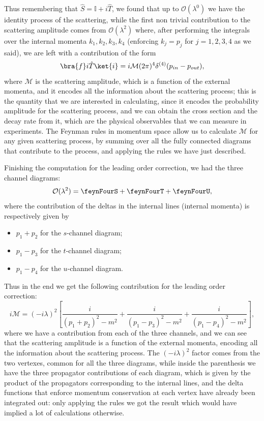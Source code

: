 Thus remembering that \(\hat{S} = \mathbb{I} + i \hat{T}\), we found that up to \(\mathcal{O}(\lambda^0)\) we have the identity process of the scattering, while the first non trivial contribution to the scattering amplitude comes from \(\mathcal{O}(\lambda^2)\) where, after performing the integrals over the internal momenta \(k_1, k_2, k_3, k_4\) (enforcing \(k_j = p_j\) for \(j=1,2,3,4\) as we said), we are left with a contribution of the form
\[
    \bra{f} i\hat{T} \ket{i} = i \mathcal{M} (2\pi)^4 \delta^{(4)} (p_{in} - p_{out} ),
\]
where \(\mathcal{M}\) is the scattering amplitude, which is a function of the external momenta, and it encodes all the information about the scattering process; this is the quantity that we are interested in calculating, since it encodes the probability amplitude for the scattering process, and we can obtain the cross section and the decay rate from it, which are the physical observables that we can measure in experiments. The Feynman rules in momentum space allow us to calculate \(\mathcal{M}\) for any given scattering process, by summing over all the fully connected diagrams that contribute to the process, and applying the rules we have just described.

Finishing the computation for the leading order correction, we had the three channel diagrams:
\[
    \mathcal{O}(\lambda^2) = \feynFourS + \feynFourT + \feynFourU,
\]
where the contribution of the deltas in the internal lines (internal momenta) is respectively given by
\begin{itemize}
    \item \(p_1 + p_2\) for the \(s\)-channel diagram;
    \item \(p_1 - p_3\) for the \(t\)-channel diagram;
    \item \(p_1 - p_4\) for the \(u\)-channel diagram.
\end{itemize}
Thus in the end we get the following contribution for the leading order correction:
\[
    i \mathcal{M} = (-i \lambda)^2 \left[ \frac{i}{(p_1 + p_2)^{2} - m^2} + \frac{i}{(p_1 - p_3)^{2} - m^2} + \frac{i}{(p_1 - p_4)^{2} - m^2} \right],
\]
where we have a contribution from each of the three channels, and we can see that the scattering amplitude is a function of the external momenta, encoding all the information about the scattering process. The \((-i \lambda)^2\) factor comes from the two vertexes, common for all the three diagrams, while inside the parenthesis we have the three propagator contributions of each diagram, which is given by the product of the propagators corresponding to the internal lines, and the delta functions that enforce momentum conservation at each vertex have already been integrated out: only applying the rules we got the result which would have implied a lot of calculations otherwise.

